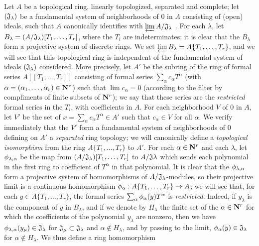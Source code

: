 \begin{env}[7.5.1]
\label{0.7.5.1}
Let $A$ be a topological ring, linearly topologized, separated and complete; let
$(\mathfrak{J}_\lambda)$ be a fundamental system of neighborhoods of $0$ in $A$
consisting of (open) ideals, such that $A$ canonically identifies with
$\varprojlim A/\mathfrak{J}_\lambda$ . For each
$\lambda$, let $B_\lambda=(A/\mathfrak{J}_\lambda)[T_1,\dots,T_r]$, where the
$T_i$ are indeterminates; it is clear that the $B_\lambda$ form a projective system
of discrete rings. We set $\varprojlim B_\lambda=A\{T_1,\dots,T_r\}$, and we will
see that this topological ring is independent of the fundamental system of ideals
$(\mathfrak{J}_\lambda)$ considered. More precisely, let $A'$ be the subring of the
ring of formal series $A[\![T_1,\dots,T_r]\!]$ consisting of formal series
$\sum_\alpha c_\alpha T^\alpha$ (with $\alpha=(\alpha_1,\dots,\alpha_r)\in\mathbf{N}^r$)
such that $\lim c_\alpha=0$ (according to the filter by compliments of finite subsets
of $\mathbf{N}^r$); we say that these series are the \emph{restricted} formal series in the
$T_i$, with coefficients in $A$.
For each neighborhood $V$ of $0$ in $A$, let $V'$ be the set of
$x=\sum_\alpha c_\alpha T^\alpha\in A'$ such that $c_\alpha\in V$ for all $\alpha$.
We verify immediately that the $V'$ form a fundamental system of neighborhoods of $0$
defining on $A'$ a \emph{separated} ring topology; we will canonically define a
\emph{topological isomorphism} from the ring $A\{T_1,\dots,T_r\}$ to $A'$. For each
$\alpha\in\mathbf{N}^r$ and each $\lambda$, let $\phi_{\lambda,\alpha}$ be the map from
$(A/\mathfrak{J}_\lambda)[T_1,\dots,T_r]$ to $A/\mathfrak{J}\lambda$ which sends each
polynomial in the first ring to coefficient of $T^\alpha$ in that polynomial. It is
clear that the $\phi_{\lambda,\alpha}$ form a projective system of homomorphisms of
$A/\mathfrak{J}_\lambda$-modules, so their projective limit is a continuous
homomorphism $\vphi_\alpha:A\{T_1,\dots,T_r\}\to A$; we will see that, for each
$y\in A\{T_1,\dots,T_r\}$, the formal series $\sum_\alpha\phi_\alpha(y)T^\alpha$ is
\emph{restricted}. Indeed, if $y_\lambda$ is the component of $y$ in $B_\lambda$, and
if we denote by $H_\lambda$ the finite set of the $\alpha\in\mathbf{N}^r$ for which the
coefficients of the polynomial $y_\lambda$ are nonzero, then we have
$\phi_{\lambda,\alpha}(y_\mu)\in\mathfrak{J}_\lambda$ for
$\mathfrak{J}_\mu\subset\mathfrak{J}_\lambda$ and $\alpha\not\in H_\lambda$, and by
passing to the limit, $\phi_\alpha(y)\in\mathfrak{J}_\lambda$ for
$\alpha\not\in H_\lambda$. We thus define a ring homomorphism

\end{env}
